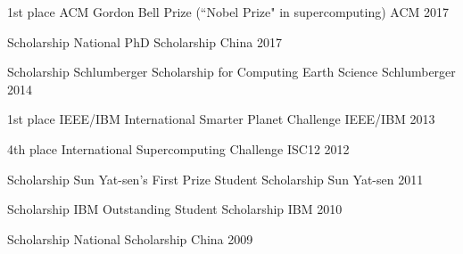 \documentclass[11pt, a4paper]{awesome-cv}
\begin{document}
\begin{cvhonors}

  \cvhonor
    {1st place} %
    {ACM Gordon Bell Prize (``Nobel Prize" in supercomputing)} %
    {ACM} %
    {2017} %

  \cvhonor
    {Scholarship} %
    {National PhD Scholarship} %
    {China} %
    {2017} %

  \cvhonor
    {Scholarship} %
    {Schlumberger Scholarship for Computing Earth Science} %
    {Schlumberger} %
    {2014} %

  \cvhonor
    {1st place} %
    {IEEE/IBM International Smarter Planet Challenge} %
    {IEEE/IBM}
    {2013} %

  \cvhonor
    {4th place} %
    {International Supercomputing Challenge} %
    {ISC12} %
    {2012} %

  \cvhonor
    {Scholarship} %
    {Sun Yat-sen’s First Prize Student Scholarship} %
    {Sun Yat-sen} %
    {2011} %

  \cvhonor
    {Scholarship} %
    {IBM Outstanding Student Scholarship} %
    {IBM} %
    {2010} %

  \cvhonor
    {Scholarship} %
    {National Scholarship} %
    {China} %
    {2009} %
\end{cvhonors}

\end{document}
